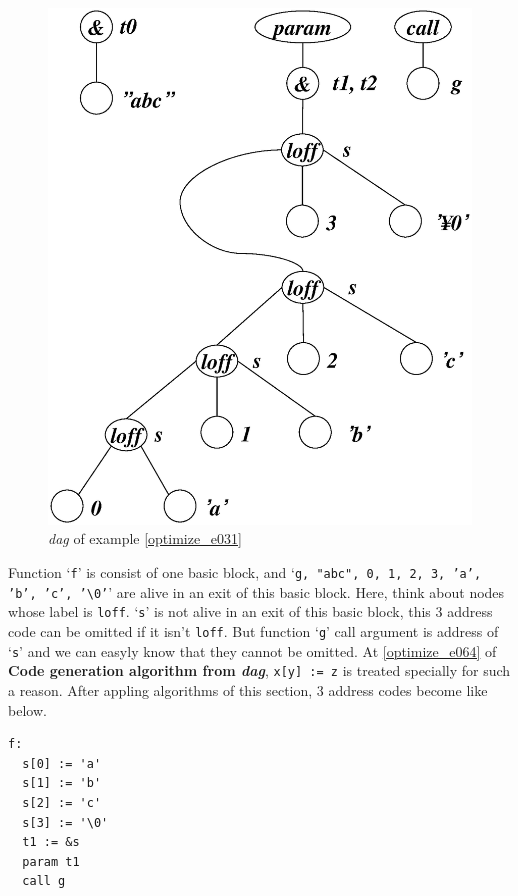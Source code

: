 \begin{Example}
\begin{figure}[htbp]
\begin{center}
\begin{latexonly}
\includegraphics[width=0.859\linewidth,height=1.0\linewidth]{opt016.eps}
\end{latexonly}
\caption{{\em dag} of example \ref{optimize_e031}}
\label{optimize_e032}
\end{center}
\end{figure}
Function `{\tt{f}}' is consist of one basic block, and 
`{\tt{g, "abc", 0, 1, 2, 3, 'a', 'b', 'c', '\verb|\|0'}}'
are alive in an exit of this basic block.
Here, think about nodes whose label is {\tt{loff}}.
`{\tt{s}}' is not alive in an exit of this basic block,
this 3 address code can be omitted if it isn't {\tt{loff}}.
But function `{\tt{g}}' call argument is address of `{\tt{s}}'
and we can easyly know that they cannot be omitted.
At \ref{optimize_e064} of {\bf Code generation algorithm from {\em dag}},
{\tt{x[y] := z}} is treated specially for such a reason.
After appling algorithms of this section,
3 address codes become like below.
\begin{verbatim}
f:
  s[0] := 'a'
  s[1] := 'b'
  s[2] := 'c'
  s[3] := '\0'
  t1 := &s
  param t1
  call g
\end{verbatim}
\end{Example}

